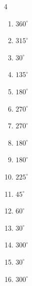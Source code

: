 \begin{multicols}{4}
\begin{enumerate}
  \item $\displaystyle 360^{\circ}$
        \phantom{$\displaystyle =2\pi$}

  \item $\displaystyle 315^{\circ}$

  \item $\displaystyle 30^{\circ}$

\columnbreak %

\resetques

  \item $\displaystyle 135^{\circ}$

  \item $\displaystyle 180^{\circ}$
        \phantom{$\displaystyle =\pi$}

  \item $\displaystyle 270^{\circ}$

  \item $\displaystyle 270^{\circ}$

  \item $\displaystyle 180^{\circ}$
        \phantom{$\displaystyle =\pi$}

  \item $\displaystyle 180^{\circ}$
        \phantom{$\displaystyle =\pi$}

  \item $\displaystyle 225^{\circ}$

  \item $\displaystyle 45^{\circ}$

  \item $\displaystyle 60^{\circ}$

  \item $\displaystyle 30^{\circ}$

  \item $\displaystyle 300^{\circ}$

  \item $\displaystyle 30^{\circ}$

  \item $\displaystyle 300^{\circ}$


\end{enumerate}
\end{multicols}
